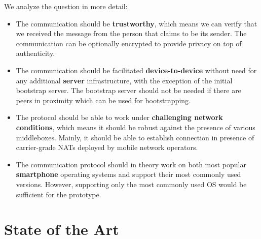 We analyze the question in more detail:
\begin{itemize}
    \item The communication should be \textbf{trustworthy}, which means we can verify that we received the message from the person that claims to be its sender. The communication can be optionally encrypted to provide privacy on top of authenticity.
    \item The communication should be facilitated \textbf{device-to-device} without need for any additional \textbf{server} infrastructure, with the exception of the initial bootstrap server. The bootstrap server should not be needed if there are peers in proximity which can be used for bootstrapping.
    \item The protocol should be able to work under \textbf{challenging network conditions}, which means it should be robust against the presence of various middleboxes. Mainly, it should be able to establish connection in presence of carrier-grade NATs deployed by mobile network operators.
    \item The communication protocol should in theory work on both most popular \textbf{smartphone} operating systems and support their most commonly used versions. However, supporting only the most commonly used OS would be sufficient for the prototype.
\end{itemize}








\chapter{State of the Art}

